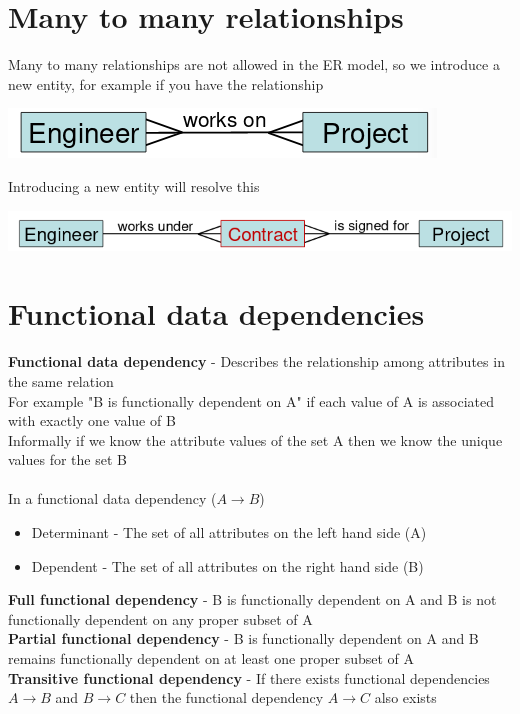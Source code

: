 \documentclass{article}[18pt]
\begin{document}
\section{Many to many relationships}
Many to many relationships are not allowed in the ER model, so we introduce a new entity, for example if you have the relationship
\begin{center}
	\includegraphics[scale=0.7]{"Many to Many"}
\end{center}
Introducing a new entity will resolve this
\begin{center}
	\includegraphics[scale=0.7]{"Many to Many1"}
\end{center}
\section{Functional data dependencies}
\textbf{Functional data dependency} - Describes the relationship among attributes in the same relation\\
For example "B is functionally dependent on A" if each value of A is associated with exactly one value of B\\
Informally if we know the attribute values of the set A then we know the unique values for the set B\\
\\
In a functional data dependency ($A\rightarrow B$)
\begin{itemize}
	\item Determinant - The set of all attributes on the left hand side (A)
	\item Dependent - The set of all attributes on the right hand side (B)
\end{itemize}
\textbf{Full functional dependency} - B is functionally dependent on A and B is not functionally dependent on any proper subset of A\\
\textbf{Partial functional dependency} - B is functionally dependent on A and B remains functionally dependent on at least one proper subset of A\\
\textbf{Transitive functional dependency} - If there exists functional dependencies $A\rightarrow B$ and $B\rightarrow C$ then the functional dependency $A\rightarrow C$ also exists
\end{document}
